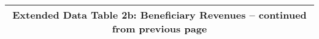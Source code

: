 \begin{longtable}{llcccccccccc}
\multicolumn{12}{c}{{\bfseries Extended Data Table 2b: Beneficiary Revenues -- continued from previous page}} \\ \hline                                                                                                                                                                                                                                                                                                                                                                                                                                                                                                                                                                                                                                                                                                                                                                                           

\end{longtable}
